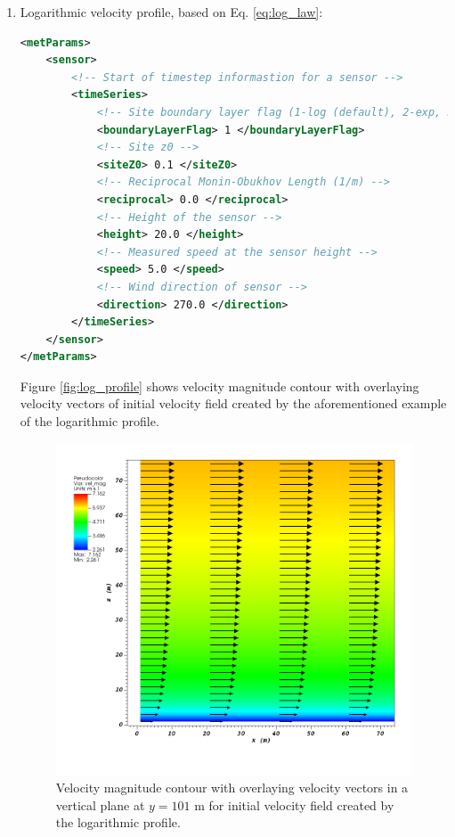 \begin{enumerate}
\item Logarithmic velocity profile, based on Eq. \ref{eq:log_law}:

\begin{lstlisting}[language=XML]
<metParams>
	<sensor>
		<!-- Start of timestep informastion for a sensor -->	
		<timeSeries>
			<!-- Site boundary layer flag (1-log (default), 2-exp, 3-urban canopy, 4-data entry) -->						
			<boundaryLayerFlag> 1 </boundaryLayerFlag> 
			<!-- Site z0 -->
			<siteZ0> 0.1 </siteZ0> 					
			<!-- Reciprocal Monin-Obukhov Length (1/m) -->			
			<reciprocal> 0.0 </reciprocal> 				
			<!-- Height of the sensor -->			
			<height> 20.0 </height> 				
			<!-- Measured speed at the sensor height -->			
			<speed> 5.0 </speed> 					
			<!-- Wind direction of sensor -->			
			<direction> 270.0 </direction> 				
		</timeSeries>
	</sensor>
</metParams>
\end{lstlisting}

Figure \ref{fig:log_profile} shows velocity magnitude contour with overlaying velocity vectors of initial velocity field created by the aforementioned example of the logarithmic profile.

\begin{figure}[H]
\includegraphics[width=\textwidth,keepaspectratio]{Images/log_y_101.png}
\caption{Velocity magnitude contour with overlaying velocity vectors in a vertical plane at $y=101$ m for initial velocity field created by the logarithmic profile.}
\end{figure}
\noindent


\end{enumerate}
